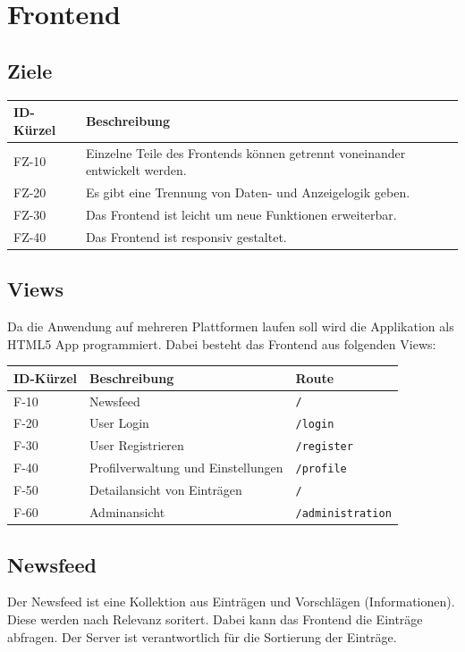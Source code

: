 \chapter{Frontend}

\section{Ziele}
\begin{tabularx}{\textwidth}{|l|X|}
    \toprule
    \textbf{ID-Kürzel} & \textbf{Beschreibung} \\
    \midrule
    \endhead
    \hline
    \caption{Ziele der Frontend-Architektur}
    \endfoot
    FZ-10 & Einzelne Teile des Frontends können getrennt voneinander entwickelt werden.\\
    FZ-20 & Es gibt eine Trennung von Daten- und Anzeigelogik geben.\\
    FZ-30 & Das Frontend ist leicht um neue Funktionen erweiterbar.\\
    FZ-40 & Das Frontend ist responsiv gestaltet.\\
\end{tabularx}

\section{Views}
Da die Anwendung auf mehreren Plattformen laufen soll wird die Applikation als HTML5 App programmiert.
Dabei besteht das Frontend aus folgenden Views:
\begin{tabularx}{\textwidth}{|l|X|l|}
    \toprule
    \textbf{ID-Kürzel} & \textbf{Beschreibung} & \textbf{Route}\\
    \midrule
    \endhead
    \hline
    \caption{Einsatzbereiche}
    \label{Einsatzbereiche:tabelle}
    \endfoot
    F-10 & Newsfeed & \verb+/+\\
    F-20 & User Login & \verb+/login+ \\
    F-30 & User Registrieren & \verb+/register+ \\
    F-40 & Profilverwaltung und Einstellungen & \verb+/profile+\\
    F-50 & Detailansicht von Einträgen & \verb+/+\\
    F-60 & Adminansicht & \verb+/administration+\\
\end{tabularx}

\section{Newsfeed}
Der Newsfeed ist eine Kollektion aus Einträgen und Vorschlägen (Informationen). Diese werden nach Relevanz soritert.
Dabei kann das Frontend die Einträge abfragen. Der Server ist verantwortlich für die Sortierung der Einträge.

